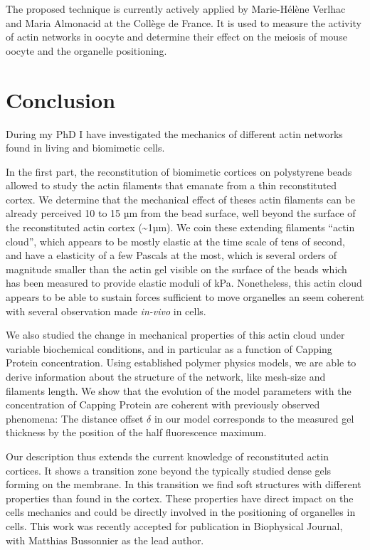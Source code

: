 \documentclass[A4paperpaper,11pt,english]{sphinxmanual}
\begin{document}
The proposed technique is currently actively applied by Marie-Hélène Verlhac and Maria Almonacid at the Collège de France.
It is used to measure the activity
of actin networks in oocyte and determine their effect on the meiosis of mouse
oocyte and the organelle positioning.


\chapter{Conclusion}
\label{index-latex::doc}\label{index-latex:conclusion}
During my  PhD I have  investigated the  mechanics of different  actin networks
found in living and biomimetic cells.

In  the first  part, the  reconstitution of  biomimetic cortices  on
polystyrene beads allowed to study the actin filaments that emanate from a thin
reconstituted cortex. We determine that the mechanical effect of theses actin
filaments can be already perceived 10 to 15 µm from  the bead surface, well
beyond the surface of the reconstituted actin cortex (\textasciitilde{}1µm).  We coin these
extending filaments ``actin cloud'', which appears to be mostly elastic  at the
time scale of tens of second, and have  a elasticity of a  few Pascals at the
most, which is several  orders of magnitude smaller than the  actin gel visible
on the surface  of the beads which has been  measured to  provide elastic
moduli of  kPa. Nonetheless,  this actin cloud appears  to be able to
sustain forces sufficient to  move organelles an seem coherent with several
observation made \emph{in-vivo} in cells.

We also  studied the change in  mechanical properties of this  actin cloud
under variable  biochemical conditions,  and in  particular as  a function  of
Capping Protein concentration. Using established polymer  physics models, we
are able to derive information about  the  structure  of the  network,  like
mesh-size  and filaments  length. We  show  that the  evolution of  the  model
parameters  with the  concentration of  Capping  Protein are  coherent  with
previously  observed phenomena: The  distance offset \(\delta\)  in our
model corresponds  to the measured gel thickness by the position of the half
fluorescence maximum.

Our  description  thus extends  the  current  knowledge of  reconstituted
actin cortices. It  shows a transition  zone beyond  the typically studied
dense gels forming  on the  membrane.  In  this transition  we  find  soft
structures  with different  properties than  found in  the cortex.  These
properties  have direct impact on the cells mechanics and  could be directly
involved in the positioning of  organelles in  cells. This  work was  recently
accepted  for publication  in Biophysical Journal, with Matthias Bussonnier as
the lead author.
\end{document}
